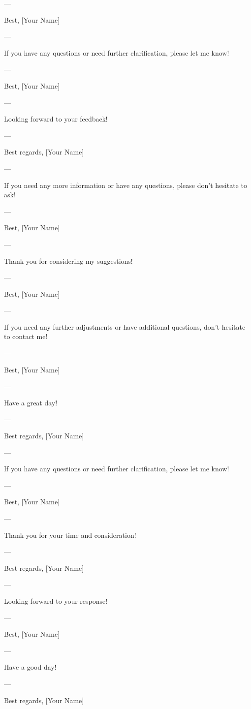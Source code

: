 --- 

Best,  
[Your Name]  

--- 

If you have any questions or need further clarification, please let me know! 

--- 

Best,  
[Your Name]  

--- 

Looking forward to your feedback! 

--- 

Best regards,  
[Your Name]  

--- 

If you need any more information or have any questions, please don't hesitate to ask! 

--- 

Best,  
[Your Name]  

--- 

Thank you for considering my suggestions! 

--- 

Best,  
[Your Name]  

--- 

If you need any further adjustments or have additional questions, don't hesitate to contact me! 

--- 

Best,  
[Your Name]  

--- 

Have a great day! 

--- 

Best regards,  
[Your Name]  

--- 

If you have any questions or need further clarification, please let me know! 

--- 

Best,  
[Your Name]  

--- 

Thank you for your time and consideration! 

--- 

Best regards,  
[Your Name]  

--- 

Looking forward to your response! 

--- 

Best,  
[Your Name]  

--- 

Have a good day! 

--- 

Best regards,  
[Your Name]  

